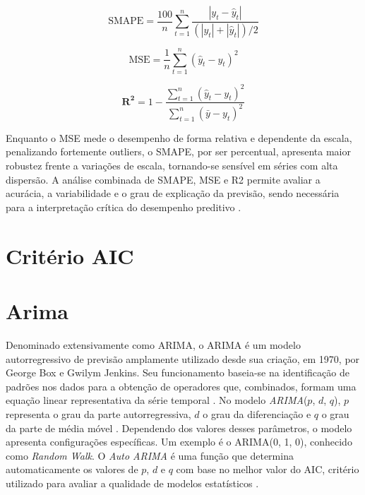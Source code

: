 \documentclass[12pt]{tcc}
\begin{document}
\begin{equation}
\text{SMAPE} = \frac{100}{n} \sum_{t=1}^{n} \frac{\left| y_t - \hat{y}_t \right|}{(\left| y_t \right| + \left| \hat{y}_t \right|)/2}
\label{eq:smape}
\end{equation}

\begin{equation}
\text{MSE} = \frac{1}{n} \sum_{t=1}^{n} (\hat{y}_t - y_t)^2
\label{eq:mse}
\end{equation}

\begin{equation}
\boldsymbol{R^2} = 1 - \frac{\sum_{t=1}^{n} (\hat{y}_t - y_t)^2}{\sum_{t=1}^{n} (\bar{y} - y_t)^2}
\label{eq:rsquared}
\end{equation}

Enquanto o \gls{MSE} mede o desempenho de forma relativa e dependente da escala, penalizando fortemente outliers, o \gls{SMAPE}, por ser percentual, apresenta maior robustez frente a variações de escala, tornando-se sensível em séries com alta dispersão. A análise combinada de \gls{SMAPE}, \gls{MSE} e \gls{R2} permite avaliar a acurácia, a variabilidade e o grau de explicação da previsão, sendo necessária para a interpretação crítica do desempenho preditivo \citep{hyndman_forecasting_2018}.

\section{Critério AIC}
\label{sec:aic}




\section{Arima}
\label{sec:arima}

Denominado extensivamente como \acrlong{ARIMA}, o \gls{ARIMA} é um modelo autorregressivo de previsão amplamente utilizado desde sua criação, em 1970, por George Box e Gwilym Jenkins. Seu funcionamento baseia-se na identificação de padrões nos dados para a obtenção de operadores que, combinados, formam uma equação linear representativa da série temporal \citep{BoxJenkins1970}. No modelo \textit{ARIMA}($p$, $d$, $q$), $p$ representa o grau da parte autorregressiva, $d$ o grau da diferenciação e $q$ o grau da parte de média móvel \citep{sato_gerenciamento_2013, hyndman_automatic_2008}. Dependendo dos valores desses parâmetros, o modelo apresenta configurações específicas. Um exemplo é o ARIMA(0, 1, 0), conhecido como \textit{Random Walk}. O \textit{Auto ARIMA} é uma função que determina automaticamente os valores de $p$, $d$ e $q$ com base no melhor valor do AIC, critério utilizado para avaliar a qualidade de modelos estatísticos \citep{hyndman_automatic_2008}.
\end{document}

